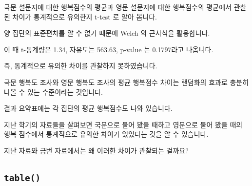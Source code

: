 \documentclass[
]{book}
\begin{document}
국문 설문지에 대한 행복점수의 평균과 영문 설문지에 대한 행복점수의 평균에서 관찰된 차이가 통계적으로 유의한지 t-test 로 알아 봅니다.

양 집단의 표준편차를 알 수 없기 때문에 Welch 의 근사식을 활용합니다.

이 때 t-통계량은 1.34, 자유도는 563.63, p-value 는 0.1797라고 나옵니다.

즉, 통계적으로 유의한 차이를 관찰하지 못하였습니다.

국문 행복도 조사와 영문 행복도 조사의 평균 행복점수 차이는 랜덤화의 효과로 충분히 나올 수 있는 수준이라는 것입니다.

결과 요약표에는 각 집단의 평균 행복점수도 나와 있습니다.

지난 학기의 자료들을 살펴보면 국문으로 물어 봤을 때하고 영문으로 물어 봤을 때의 행복 점수에서 통계적으로 유의한 차이가 있었다는 것을 알 수 있습니다.

지난 자료와 금번 자료에서는 왜 이러한 차이가 관찰되는 걸까요?

\subsection{\texorpdfstring{\texttt{table()}}{table()}}\label{table-1}
\end{document}
